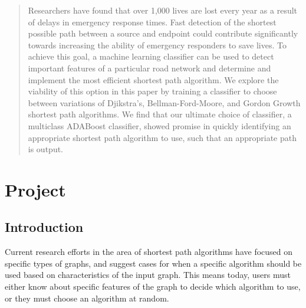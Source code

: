 \documentclass{article}
\begin{document}
 


\begin{abstract} 
Researchers have found that over 1,000 lives are lost every year as a result of delays in emergency response times. Fast detection of the shortest possible path between a source and endpoint could contribute significantly towards increasing the ability of emergency responders to save lives. To achieve this goal, a machine learning classifier can be used to detect important features of a particular road network and determine and implement the most efficient shortest path algorithm. We explore the viability of this option in this paper by training a classifier to choose between variations of Djikstra’s, Bellman-Ford-Moore, and Gordon Growth shortest path algorithms. We find that our ultimate choice of classifier, a multiclass ADABoost classifier, showed promise in quickly identifying an appropriate shortest path algorithm to use, such that an appropriate path is output. 
\end{abstract} 



\section{Project }

\subsection{Introduction}

Current research efforts in the area of shortest path algorithms have focused on specific types of graphs, and suggest cases for when a specific algorithm should be used based on characteristics of the input graph. This means today, users must either know about specific features of the graph to decide which algorithm to use, or they must choose an algorithm at random. 
\end{document}
